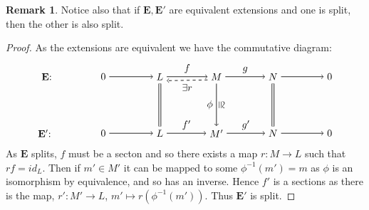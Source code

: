 \documentclass[11.5pt, twoside, a4paper, titlepage]{report}
\theoremstyle{definition}
\newtheorem{rem}[mydef]{Remark}
\theoremstyle{plain}
\begin{document}
\begin{rem}
Notice also that if $\mathbf{E}, \mathbf{E'}$ are equivalent extensions and one is split, then the other is also split.
\end{rem}
\begin{proof}
As the extensions are equivalent we have the commutative diagram:
\begin{equation*}
\begin{tikzpicture}[->,-latex, auto, main path/.style={->, semithick}, main node/.style={}]
\node	[main node]		(1) at (0,0)		{$\mathbf{E}$:};
\node	[main node]		(2) at (2,0)		{$0$};
\node	[main node]		(3) at (4,0)		{$L$};
\node [main node]		(4) at (6,0)		{$M$};
\node [main node]		(5) at (8,0)		{$N$};
\node	[main node]		(11) at (10,0)	{$0$};

\node	[main node]		(6) at (0,-2)		{$\mathbf{E'}$: \quad};
\node	[main node]		(7) at (2,-2)		{$0$};
\node	[main node]		(8) at (4,-2)		{$L$};
\node [main node]		(9) at (6,-2)		{$M'$};
\node [main node]		(10) at (8,-2)	{$N$};
\node [main node]		(13) at (10,-2)	{$0$};

\draw (2) edge [main path] node [auto] {$$} (3);
\path (3.0) edge [main path] node [auto] {$f$} (4.180);
\path (4.200) edge [dashed, ->, semithick] node [auto] {$\exists r$} (3.330);
\draw (4) edge [main path] node [auto] {$g$} (5);
\draw (5) edge [main path] (11);


\draw (7) edge [main path] node [auto] {$$} (8);
\draw (8) edge [main path] node [auto] {$f'$} (9);
\draw (9) edge [main path] node [auto] {$g'$} (10);
\draw (10) edge [main path] (13);

\draw (3) edge [-, semithick, double, double distance=1.5pt] (8);
\draw (4) edge [main path] node [above,sloped,inner sep=1pt] {$\cong$} node [auto, swap] {$\phi$} (9);
\draw (5) edge [-, semithick, double, double distance=1.5pt](10);
\end{tikzpicture}
\end{equation*}
As $\mathbf{E}$ splits, $f$ must be a secton and so there exists a map $r: M \to L$ such that $rf=id_L$. Then if $m'\in M'$ it can be mapped to some $\phi^{-1}(m')=m$ as $\phi$ is an isomorphism by equivalence, and so has an inverse. Hence $f'$ is a sections as there is the map, $r':M' \to L$, $m' \mapsto r(\phi^{-1}(m'))$. Thus $\mathbf{E'}$ is split.
\end{proof}
\end{document}
